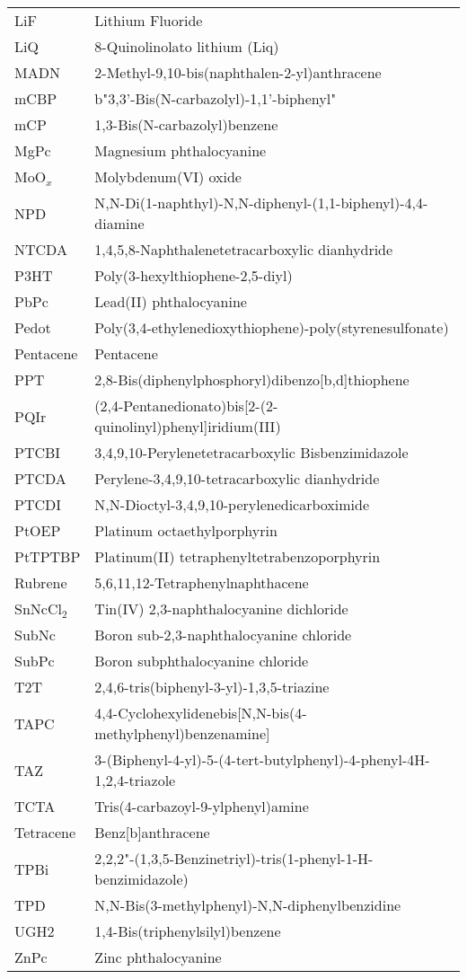 \documentclass[../thesis.tex]{subfiles}
\begin{document}
\begin{longtable}{p{} p{}}
 LiF & Lithium Fluoride \\
 LiQ & 8-Quinolinolato lithium (Liq) \\
 MADN & 2-Methyl-9,10-bis(naphthalen-2-yl)anthracene \\
 mCBP & b"3,3'-Bis(N-carbazolyl)-1,1'-biphenyl" \\
 mCP & 1,3-Bis(N-carbazolyl)benzene \\
 MgPc & Magnesium phthalocyanine \\
 MoO$_x$ & Molybdenum(VI) oxide \\
 NPD & N,N-Di(1-naphthyl)-N,N-diphenyl-(1,1-biphenyl)-4,4-diamine \\
 NTCDA & 1,4,5,8-Naphthalenetetracarboxylic dianhydride \\
 P3HT & Poly(3-hexylthiophene-2,5-diyl) \\
 PbPc & Lead(II) phthalocyanine \\
 Pedot & Poly(3,4-ethylenedioxythiophene)-poly(styrenesulfonate) \\
 Pentacene & Pentacene \\
 PPT & 2,8-Bis(diphenylphosphoryl)dibenzo[b,d]thiophene \\
 PQIr & (2,4-Pentanedionato)bis[2-(2-quinolinyl)phenyl]iridium(III) \\
 PTCBI & 3,4,9,10-Perylenetetracarboxylic Bisbenzimidazole  \\
 PTCDA & Perylene-3,4,9,10-tetracarboxylic dianhydride \\
 PTCDI & N,N-Dioctyl-3,4,9,10-perylenedicarboximide \\
 PtOEP & Platinum octaethylporphyrin \\
 PtTPTBP & Platinum(II) tetraphenyltetrabenzoporphyrin \\
 Rubrene & 5,6,11,12-Tetraphenylnaphthacene \\
 SnNcCl$_2$ & Tin(IV) 2,3-naphthalocyanine dichloride \\
 SubNc & Boron sub-2,3-naphthalocyanine chloride \\
 SubPc & Boron subphthalocyanine chloride \\
 T2T & 2,4,6-tris(biphenyl-3-yl)-1,3,5-triazine \\
 TAPC & 4,4-Cyclohexylidenebis[N,N-bis(4-methylphenyl)benzenamine] \\
 TAZ & 3-(Biphenyl-4-yl)-5-(4-tert-butylphenyl)-4-phenyl-4H-1,2,4-triazole \\
 TCTA & Tris(4-carbazoyl-9-ylphenyl)amine \\
 Tetracene & Benz[b]anthracene \\
 TPBi & 2,2,2"-(1,3,5-Benzinetriyl)-tris(1-phenyl-1-H-benzimidazole) \\
 TPD & N,N-Bis(3-methylphenyl)-N,N-diphenylbenzidine \\
 UGH2 & 1,4-Bis(triphenylsilyl)benzene \\
 ZnPc & Zinc phthalocyanine \\
\end{longtable}
\end{document}
